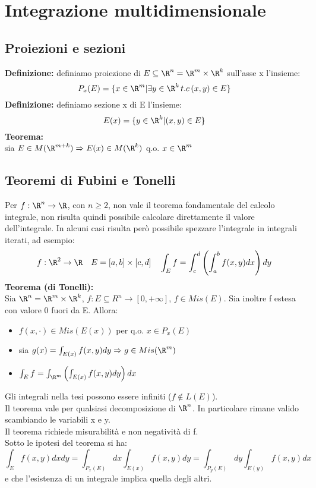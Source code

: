 \documentclass{article}
\begin{document}
\newpage
\section{Integrazione multidimensionale}
\subsection{Proiezioni e sezioni}
\textbf{Definizione:} definiamo proiezione di $E\subseteq\R^n=\R^m\times\R^k$ sull'asse x l'insieme:
$$P_x(E)=\{x\in\R^m|\exists y\in\R^k\,t.c\,(x,y)\in E \}$$
\textbf{Definizione:} definiamo sezione x di E l'insieme:
$$ E(x)=\{y\in\R^k|(x,y)\in E\} $$
\textbf{Teorema:}\\ sia $E\in M(\R^{m+k})\Rightarrow E(x)\in M(\R^k)$ q.o. $x\in\R^m$

\subsection{Teoremi di Fubini e Tonelli}
Per $f:\R^n\rightarrow\R$, con $n\geq2$, non vale il teorema fondamentale del calcolo integrale, non risulta quindi possibile calcolare direttamente il valore dell'integrale. In alcuni casi risulta però possibile spezzare l'integrale in integrali iterati, ad esempio:
$$f:\R^2\rightarrow\R\quad E=[a,b]\times[c,d]\quad \int_Ef=\int_c^d\left(\int_a^b f(x,y) dx \right)dy$$
\textbf{Teorema (di Tonelli):}\\
Sia $\R^n=\R^m\times\R^k$, $f:E\subseteq R^n\rightarrow[0,+\infty]$, $f\in Mis(E)$. Sia inoltre f estesa con valore 0 fuori da E. Allora:
\begin{itemize}
    \item $f(x,\cdot)\in Mis(E(x))$ per q.o. $x\in P_x(E)$
    \item sia $g(x)=\int_{E(x)}f(x,y)dy\Rightarrow g\in Mis(\R^m)$
    \item $\int_Ef=\int_{\R^m}\left(\int_{E(x)}f(x,y)dy\right)dx$
\end{itemize}
Gli integrali nella tesi possono essere infiniti ($f\notin L(E)$).\\
Il teorema vale per qualsiasi decomposizione di $\R^n$. In particolare rimane valido scambiando le variabili x e y.\\
Il teorema richiede misurabilità e non negatività di f.\\
Sotto le ipotesi del teorema si ha:
$$ \int_Ef(x,y)dxdy=\int_{P_x(E)}dx\int_{E(x)}f(x,y)dy=\int_{P_y(E)}dy\int_{E(y)}f(x,y)dx $$
e che l'esistenza di un integrale implica quella degli altri.\\\\
\end{document}
